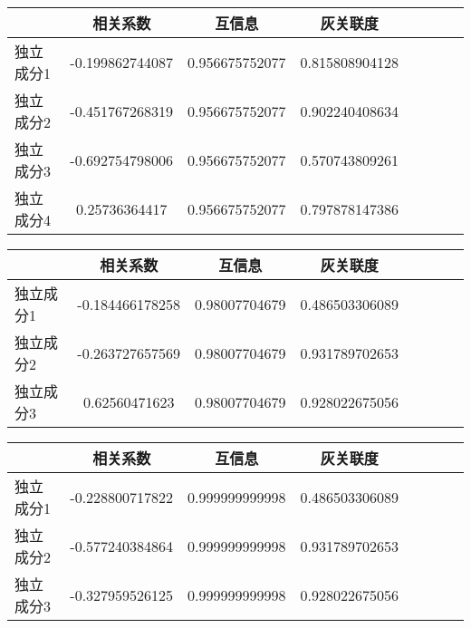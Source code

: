 \begin{table}[!tphb] 
\begin{center}
\begin{tabular}{lccclccc} 
 \toprule 
& 相关系数   & 互信息    &灰关联度 \\ 
\midrule 
独立成分1	& -0.199862744087	& 0.956675752077	& 0.815808904128	\\ 
独立成分2	& -0.451767268319	& 0.956675752077	& 0.902240408634	\\ 
独立成分3	& -0.692754798006	& 0.956675752077	& 0.570743809261	\\ 
独立成分4	& 0.25736364417	& 0.956675752077	& 0.797878147386	\\ 
\bottomrule 
 \end{tabular} 
\end{center} 
 \end{table} 


\begin{table}[!tphb] 
\begin{center}
\begin{tabular}{lccclccc} 
 \toprule 
& 相关系数   & 互信息    &灰关联度 \\ 
\midrule 
独立成分1	& -0.184466178258	& 0.98007704679	& 0.486503306089	\\ 
独立成分2	& -0.263727657569	& 0.98007704679	& 0.931789702653	\\ 
独立成分3	& 0.62560471623	& 0.98007704679	& 0.928022675056	\\ 
\bottomrule 
 \end{tabular} 
\end{center} 
 \end{table} 


\begin{table}[!tphb] 
\begin{center}
\begin{tabular}{lccclccc} 
 \toprule 
& 相关系数   & 互信息    &灰关联度 \\ 
\midrule 
独立成分1	& -0.228800717822	& 0.999999999998	& 0.486503306089	\\ 
独立成分2	& -0.577240384864	& 0.999999999998	& 0.931789702653	\\ 
独立成分3	& -0.327959526125	& 0.999999999998	& 0.928022675056	\\ 
\bottomrule 
 \end{tabular} 
\end{center} 
 \end{table} 


